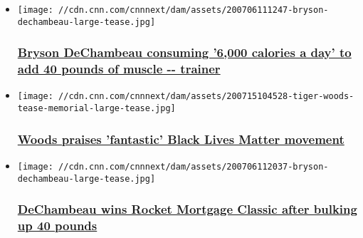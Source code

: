 \begin{itemize}
\item
  \href{/2020/08/06/golf/bryson-dechambeau-calorie-trainer-bulking-muscle-golf-spt-intl/index.html}{}

  \texttt{[image: //cdn.cnn.com/cnnnext/dam/assets/200706111247-bryson-dechambeau-large-tease.jpg]}

  \hypertarget{bryson-dechambeau-consuming-6000-calories-a-day-to-add-40-pounds-of-muscle----trainer}{%
  \subsubsection{\texorpdfstring{\href{/2020/08/06/golf/bryson-dechambeau-calorie-trainer-bulking-muscle-golf-spt-intl/index.html}{Bryson
  DeChambeau consuming '6,000 calories a day' to add 40 pounds of muscle
  -\/-
  trainer}}{Bryson DeChambeau consuming '6,000 calories a day' to add 40 pounds of muscle -\/- trainer}}\label{bryson-dechambeau-consuming-6000-calories-a-day-to-add-40-pounds-of-muscle----trainer}}
\item
  \href{/2020/07/15/golf/tiger-woods-blm-coronavirus-memorial-spt-intl/index.html}{}

  \texttt{[image: //cdn.cnn.com/cnnnext/dam/assets/200715104528-tiger-woods-tease-memorial-large-tease.jpg]}

  \hypertarget{woods-praises-fantastic-black-lives-matter-movement}{%
  \subsubsection{\texorpdfstring{\href{/2020/07/15/golf/tiger-woods-blm-coronavirus-memorial-spt-intl/index.html}{Woods
  praises 'fantastic' Black Lives Matter
  movement}}{Woods praises 'fantastic' Black Lives Matter movement}}\label{woods-praises-fantastic-black-lives-matter-movement}}
\item
  \href{/2020/07/06/sport/bryson-dechambeau-rocket-mortgage-classic-pga-tour-golf-spt-intl/index.html}{}

  \texttt{[image: //cdn.cnn.com/cnnnext/dam/assets/200706112037-bryson-dechambeau-large-tease.jpg]}

  \hypertarget{dechambeau-wins-rocket-mortgage-classic-after-bulking-up-40-pounds}{%
  \subsubsection{\texorpdfstring{\href{/2020/07/06/sport/bryson-dechambeau-rocket-mortgage-classic-pga-tour-golf-spt-intl/index.html}{DeChambeau
  wins Rocket Mortgage Classic after bulking up 40
  pounds}}{DeChambeau wins Rocket Mortgage Classic after bulking up 40 pounds}}\label{dechambeau-wins-rocket-mortgage-classic-after-bulking-up-40-pounds}}
\end{itemize}

